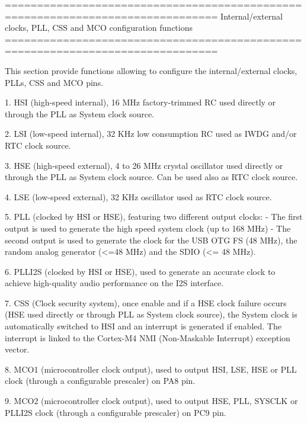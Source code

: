 \begin{DoxyVerb} ===============================================================================
      Internal/external clocks, PLL, CSS and MCO configuration functions
 ===============================================================================  

  This section provide functions allowing to configure the internal/external clocks,
  PLLs, CSS and MCO pins.
  
  1. HSI (high-speed internal), 16 MHz factory-trimmed RC used directly or through
     the PLL as System clock source.

  2. LSI (low-speed internal), 32 KHz low consumption RC used as IWDG and/or RTC
     clock source.

  3. HSE (high-speed external), 4 to 26 MHz crystal oscillator used directly or
     through the PLL as System clock source. Can be used also as RTC clock source.

  4. LSE (low-speed external), 32 KHz oscillator used as RTC clock source.   

  5. PLL (clocked by HSI or HSE), featuring two different output clocks:
      - The first output is used to generate the high speed system clock (up to 168 MHz)
      - The second output is used to generate the clock for the USB OTG FS (48 MHz),
        the random analog generator (<=48 MHz) and the SDIO (<= 48 MHz).

  6. PLLI2S (clocked by HSI or HSE), used to generate an accurate clock to achieve 
     high-quality audio performance on the I2S interface.
  
  7. CSS (Clock security system), once enable and if a HSE clock failure occurs 
     (HSE used directly or through PLL as System clock source), the System clock
     is automatically switched to HSI and an interrupt is generated if enabled. 
     The interrupt is linked to the Cortex-M4 NMI (Non-Maskable Interrupt) 
     exception vector.   

  8. MCO1 (microcontroller clock output), used to output HSI, LSE, HSE or PLL
     clock (through a configurable prescaler) on PA8 pin.

  9. MCO2 (microcontroller clock output), used to output HSE, PLL, SYSCLK or PLLI2S
     clock (through a configurable prescaler) on PC9 pin.\end{DoxyVerb}
 

